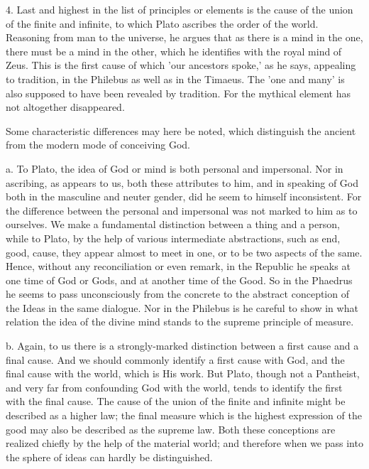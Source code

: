 \documentclass[11pt,letter]{article}
\begin{document}
\par  4. Last and highest in the list of principles or elements is the cause of the union of the finite and infinite, to which Plato ascribes the order of the world. Reasoning from man to the universe, he argues that as there is a mind in the one, there must be a mind in the other, which he identifies with the royal mind of Zeus. This is the first cause of which 'our ancestors spoke,' as he says, appealing to tradition, in the Philebus as well as in the Timaeus. The 'one and many' is also supposed to have been revealed by tradition. For the mythical element has not altogether disappeared.

\par  Some characteristic differences may here be noted, which distinguish the ancient from the modern mode of conceiving God.

\par  a. To Plato, the idea of God or mind is both personal and impersonal. Nor in ascribing, as appears to us, both these attributes to him, and in speaking of God both in the masculine and neuter gender, did he seem to himself inconsistent. For the difference between the personal and impersonal was not marked to him as to ourselves. We make a fundamental distinction between a thing and a person, while to Plato, by the help of various intermediate abstractions, such as end, good, cause, they appear almost to meet in one, or to be two aspects of the same. Hence, without any reconciliation or even remark, in the Republic he speaks at one time of God or Gods, and at another time of the Good. So in the Phaedrus he seems to pass unconsciously from the concrete to the abstract conception of the Ideas in the same dialogue. Nor in the Philebus is he careful to show in what relation the idea of the divine mind stands to the supreme principle of measure.

\par  b. Again, to us there is a strongly-marked distinction between a first cause and a final cause. And we should commonly identify a first cause with God, and the final cause with the world, which is His work. But Plato, though not a Pantheist, and very far from confounding God with the world, tends to identify the first with the final cause. The cause of the union of the finite and infinite might be described as a higher law; the final measure which is the highest expression of the good may also be described as the supreme law. Both these conceptions are realized chiefly by the help of the material world; and therefore when we pass into the sphere of ideas can hardly be distinguished.
\end{document}
